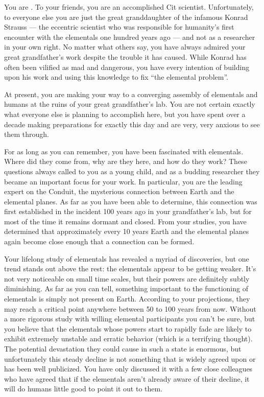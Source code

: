 \documentclass[char]{elementals}
\begin{document}
\name{\cGD{}}

You are \cGD{\intro}. To your friends, you are an accomplished Cit scientist. Unfortunately, to everyone else you are just the great granddaughter of the infamous Konrad Strauss --- the eccentric scientist who was responsible for humanity's first encounter with the elementals one hundred years ago --- and not as a researcher in your own right. No matter what others say, you have always admired your great grandfather's work despite the trouble it has caused. While Konrad has often been vilified as mad and dangerous, you have every intention of building upon his work and using this knowledge to fix ``the elemental problem''.

At present, you are making your way to a converging assembly of elementals and humans at the ruins of your great grandfather's lab. You are not certain exactly what everyone else is planning to accomplish here, but you have spent over a decade making preparations for exactly this day and are very, very anxious to see them through.


For as long as you can remember, you have been fascinated with elementals. Where did they come from, why are they here, and how do they work? These questions always called to you as a young child, and as a budding researcher they became an important focus for your work. In particular, you are the leading expert on the Conduit, the mysterious connection between Earth and the elemental planes. As far as you have been able to determine, this connection was first established in the incident 100 years ago in your grandfather's lab, but for most of the time it remains dormant and closed. From your studies, you have determined that approximately every 10 years Earth and the elemental planes again become close enough that a connection can be formed.

Your lifelong study of elementals has revealed a myriad of discoveries, but one trend stands out above the rest: the elementals appear to be getting weaker. It's not very noticeable on small time scales, but their powers are definitely subtly diminishing. As far as you can tell, something important to the functioning of elementals is simply not present on Earth. According to your projections, they may reach a critical point anywhere between 50 to 100 years from now. Without a more rigorous study with willing elemental participants you can't be sure, but you believe that the elementals whose powers start to rapidly fade are likely to exhibit extremely unstable and erratic behavior (which is a terrifying thought). The potential devastation they could cause in such a state is enormous, but unfortunately this steady decline is not something that is widely agreed upon or has been well publicized. You have only discussed it with a few close colleagues who have agreed that if the elementals aren't already aware of their decline, it will do humans little good to point it out to them.
\end{document}
